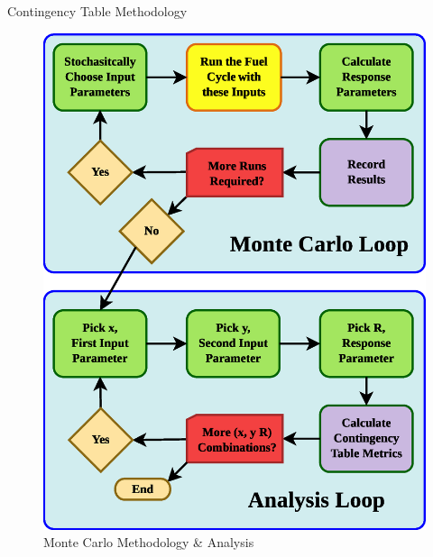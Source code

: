 \documentclass[pdf, autumn, slideColor, nocolorBG]{prosper}
\begin{document}
\begin{slide}{Contingency Table Methodology}
\begin{center}
\begin{figure}
\caption{Monte Carlo Methodology \& Analysis}
\includegraphics[scale=0.25]{figs/MonteCarloMethodology.eps}
\end{figure}
\end{center}
\end{slide}
\end{document}
